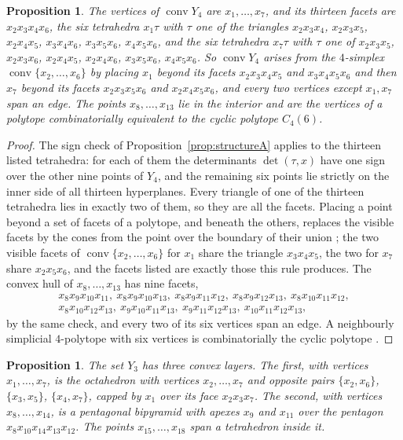 \documentclass[aps,prd,twocolumn,superscriptaddress,nofootinbib,longbibliography,floatfix,showkeys,amsmath,amssymb,10pt]{revtex4-2}
\theoremstyle{plain}
\newtheorem{proposition}[theorem]{Proposition}
\theoremstyle{definition}
\theoremstyle{plain}
\newcommand{\conv}{\operatorname{conv}}
\begin{document}
\begin{proposition}\label{prop:structureCfour}
The vertices of $\conv Y_4$ are $x_1,\dots,x_7$, and its thirteen facets are $x_2x_3x_4x_6$, the six tetrahedra $x_1\tau$ with $\tau$ one of the triangles $x_2x_3x_4$, $x_2x_3x_5$, $x_2x_4x_5$, $x_3x_4x_6$, $x_3x_5x_6$, $x_4x_5x_6$, and the six tetrahedra $x_7\tau$ with $\tau$ one of $x_2x_3x_5$, $x_2x_3x_6$, $x_2x_4x_5$, $x_2x_4x_6$, $x_3x_5x_6$, $x_4x_5x_6$. So $\conv Y_4$ arises from the $4$-simplex $\conv\{x_2,\dots,x_6\}$ by placing $x_1$ beyond its facets $x_2x_3x_4x_5$ and $x_3x_4x_5x_6$ and then $x_7$ beyond its facets $x_2x_3x_5x_6$ and $x_2x_4x_5x_6$, and every two vertices except $x_1,x_7$ span an edge. The points $x_8,\dots,x_{13}$ lie in the interior and are the vertices of a polytope combinatorially equivalent to the cyclic polytope $C_4(6)$.
\end{proposition}

\begin{proof}
The sign check of Proposition~\ref{prop:structureA} applies to the thirteen listed tetrahedra: for each of them the determinants $\det(\tau,x)$ have one sign over the other nine points of $Y_4$, and the remaining six points lie strictly on the inner side of all thirteen hyperplanes. Every triangle of one of the thirteen tetrahedra lies in exactly two of them, so they are all the facets. Placing a point beyond a set of facets of a polytope, and beneath the others, replaces the visible facets by the cones from the point over the boundary of their union \cite[Theorem~5.2.1]{Gru03}; the two visible facets of $\conv\{x_2,\dots,x_6\}$ for $x_1$ share the triangle $x_3x_4x_5$, the two for $x_7$ share $x_2x_5x_6$, and the facets listed are exactly those this rule produces. The convex hull of $x_8,\dots,x_{13}$ has nine facets,
\[
\begin{gathered}
x_8x_9x_{10}x_{11},\ x_8x_9x_{10}x_{13},\ x_8x_9x_{11}x_{12},\ x_8x_9x_{12}x_{13},\ x_8x_{10}x_{11}x_{12},\\
x_8x_{10}x_{12}x_{13},\ x_9x_{10}x_{11}x_{13},\ x_9x_{11}x_{12}x_{13},\ x_{10}x_{11}x_{12}x_{13},
\end{gathered}
\]
by the same check, and every two of its six vertices span an edge. A neighbourly simplicial $4$-polytope with six vertices is combinatorially the cyclic polytope \cite{Gru03}.
\end{proof}

\begin{proposition}\label{prop:structureCthree}
The set $Y_3$ has three convex layers. The first, with vertices $x_1,\dots,x_7$, is the octahedron with vertices $x_2,\dots,x_7$ and opposite pairs $\{x_2,x_6\}$, $\{x_3,x_5\}$, $\{x_4,x_7\}$, capped by $x_1$ over its face $x_2x_3x_7$. The second, with vertices $x_8,\dots,x_{14}$, is a pentagonal bipyramid with apexes $x_9$ and $x_{11}$ over the pentagon $x_8x_{10}x_{14}x_{13}x_{12}$. The points $x_{15},\dots,x_{18}$ span a tetrahedron inside it.
\end{proposition}
\end{document}
